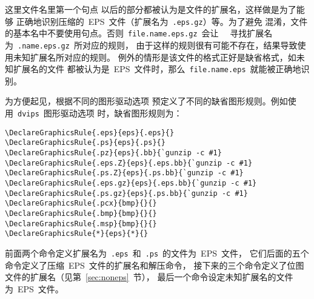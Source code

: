 这里文件名里第一个句点 
以后的部分都被认为是文件的扩展名，这样做是为了能够
正确地识别压缩的~EPS~文件（扩展名为~\texttt{.eps.gz}）等。为了避免
混淆，文件的基本名中不要使用句点。否则~\texttt{file.name.eps.gz}~会让
~~寻找扩展名为~\texttt{.name.eps.gz}~所对应的规则，
由于这样的规则很有可能不存在，结果导致使用未知扩展名所对应的规则。
例外的情形是该文件的格式正好是缺省格式，如未知扩展名的文件
都被认为是~EPS~文件时，那么~\texttt{file.name.eps}~就能被正确地识别。

为方便起见，根据不同的图形驱动选项
预定义了不同的缺省图形规则。例如使用~\texttt{dvips}~图形驱动选项
时，缺省图形规则为：

\begin{Verbatim}[xleftmargin=1cm]
\DeclareGraphicsRule{.eps}{eps}{.eps}{}
\DeclareGraphicsRule{.ps}{eps}{.ps}{}
\DeclareGraphicsRule{.pz}{eps}{.bb}{`gunzip -c #1}
\DeclareGraphicsRule{.eps.Z}{eps}{.eps.bb}{`gunzip -c #1}
\DeclareGraphicsRule{.ps.Z}{eps}{.ps.bb}{`gunzip -c #1}
\DeclareGraphicsRule{.eps.gz}{eps}{.eps.bb}{`gunzip -c #1}
\DeclareGraphicsRule{.ps.gz}{eps}{.ps.bb}{`gunzip -c #1}
\DeclareGraphicsRule{.pcx}{bmp}{}{}
\DeclareGraphicsRule{.bmp}{bmp}{}{}
\DeclareGraphicsRule{.msp}{bmp}{}{}
\DeclareGraphicsRule{*}{eps}{*}{}
\end{Verbatim}

前面两个命令定义扩展名为~\texttt{.eps}~和~\texttt{.ps}~的文件为~EPS~文件，
它们后面的五个命令定义了压缩~EPS~文件的扩展名和解压命令，
接下来的三个命令定义了位图文件的扩展名（见第~\ref{sec:noneps}~节），
最后一个命令设定未知扩展名的文件为~EPS~文件。

\endinput

